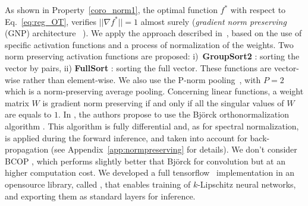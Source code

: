 As shown in Property~\ref{coro_norm1}, the optimal function $f^*$ with respect to Eq.~\eqref{eq:reg_OT}, verifies $||\nabla f^* ||=1$ almost surely (\textit{gradient norm preserving} (GNP) architecture~\cite{pmlr-v97-anil19a} ). We apply the approach described in~\cite{pmlr-v97-anil19a}, based on the use of specific activation functions and a process of normalization  of the weights. Two norm preserving activation functions are proposed: i)\ \textbf{GroupSort2} : sorting the vector by pairs, ii) \textbf{FullSort} : sorting the full vector.
These functions are vector-wise rather than element-wise. We also use the P-norm pooling~\cite{boureau2010}, with $P=2$ which is a norm-preserving average pooling.
Concerning linear functions, a weight matrix $W$ is gradient norm preserving if and only if all the singular values of $W$ are equals to $1$. In \cite{pmlr-v97-anil19a}, the authors propose to use the Björck orthonormalization algorithm \cite{bjorck71Ortho}. This algorithm is fully differential and, as for spectral normalization, is applied during the forward inference, and taken into account for back-propagation (see Appendix~\ref{app:normpreserving} for details). We don't consider BCOP \cite{qian_l2-nonexpansive_2019}, which performs slightly better that Björck for convolution but at an higher computation cost. We developed a full tensorflow~\cite{tensorflow2015-whitepaper} implementation in an opensource library, called \Deellip, that enables training of $k$-Lipschitz neural networks, and exporting them as standard layers for inference. 
